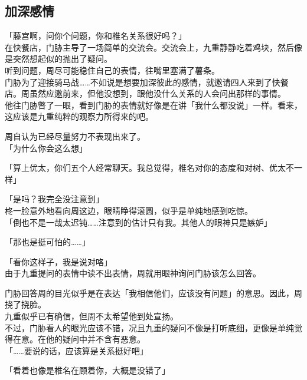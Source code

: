 \subsection{加深感情}

「藤宫啊，问你个问题，你和椎名关系很好吗？」\\

在快餐店，门胁主导了一场简单的交流会。交流会上，九重静静吃着鸡块，然后像是突然想起似的抛出了疑问。\\

听到问题，周尽可能稳住自己的表情，往嘴里塞满了薯条。\\

门胁为了迎接骑马战……不如说是想要加深彼此的感情，就邀请四人来到了快餐店。周虽然应邀前来，但他没想到，跟他没什么关系的人会问出那样的事情。\\

他往门胁瞥了一眼，看到门胁的表情就好像是在讲「我什么都没说」一样。看来，这应该是九重纯粹的观察力所得来的吧。

周自认为已经尽量努力不表现出来了。\\

「为什么你会这么想」

「算上优太，你们五个人经常聊天。我总觉得，椎名对你的态度和对树、优太不一样」

「是吗？我完全没注意到」\\

柊一脸意外地看向周这边，眼睛睁得滚圆，似乎是单纯地感到吃惊。\\

「倒也不是一哉太迟钝……注意到的估计只有我。其他人的眼神只是嫉妒」

「那也是挺可怕的……」

「看你这样子，我是说对咯」\\

由于九重提问的表情中读不出表情，周就用眼神询问门胁该怎么回答。

门胁回答周的目光似乎是在表达「我相信他们，应该没有问题」的意思。因此，周挠了挠脸。\\

九重似乎已有确信，但周不太希望他到处宣扬。\\

不过，门胁看人的眼光应该不错，况且九重的疑问不像是打听底细，更像是单纯觉得在意。在他的疑问中并不含有恶意。\\

「……要说的话，应该算是关系挺好吧」

「看着也像是椎名在顾着你，大概是没错了」

